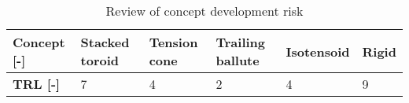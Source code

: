 \begin{table}
\centering
\caption{Review of concept development risk}
\begin{tabular}{|l|l|l|l|l|l|}
\hline
\textbf{Concept {[}-{]}} & \textbf{Stacked toroid} & \textbf{Tension cone} & \textbf{Trailing ballute} & \textbf{Isotensoid} & \textbf{Rigid} \\ \hline \hline
\textbf{TRL {[}-{]}}     &\cellcolor{green!70} 7  &\cellcolor{yellow!75}  4   &\cellcolor{red!60} 2 & \cellcolor{yellow!75}      4          &\cellcolor{green!70} 9     \\ \hline
\end{tabular}
\label{tab:gls_rev}
\end{table}







